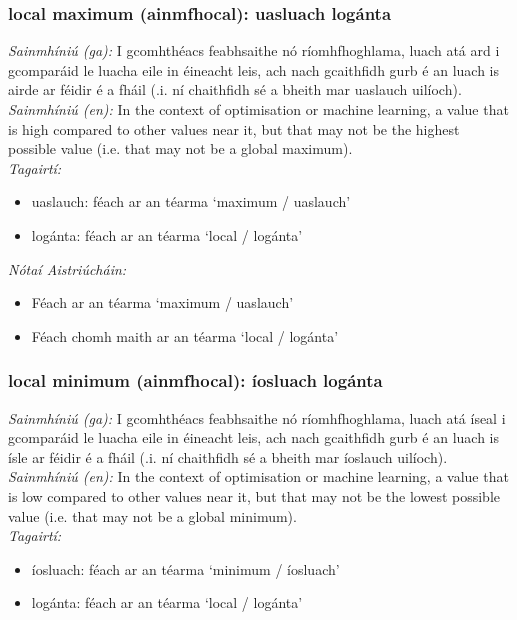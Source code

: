 \subsubsection*{local maximum (ainmfhocal): uasluach logánta}
 \noindent \textit{Sainmhíniú (ga):} I gcomhthéacs feabhsaithe nó ríomhfhoghlama, luach atá ard i gcomparáid le luacha eile in éineacht leis, ach nach gcaithfidh gurb é an luach is airde ar féidir é a fháil (.i. ní chaithfidh sé a bheith mar uaslauch uilíoch).
\\
 \noindent \textit{Sainmhíniú (en):} In the context of optimisation or machine learning, a value that is high compared to other values near it, but that may not be the highest possible value (i.e. that may not be a global maximum).
\\
 \noindent \textit{Tagairtí:}
\begin{itemize}
	\item uaslauch: féach ar an téarma `maximum / uaslauch'
	\item logánta: féach ar an téarma `local / logánta'
\end{itemize}

 \noindent \textit{Nótaí Aistriúcháin:}
\begin{itemize}
	\item Féach ar an téarma `maximum / uaslauch'
	\item Féach chomh maith ar an téarma `local / logánta'
\end{itemize}


\subsubsection*{local minimum (ainmfhocal): íosluach logánta}
 \noindent \textit{Sainmhíniú (ga):} I gcomhthéacs feabhsaithe nó ríomhfhoghlama, luach atá íseal i gcomparáid le luacha eile in éineacht leis, ach nach gcaithfidh gurb é an luach is ísle ar féidir é a fháil (.i. ní chaithfidh sé a bheith mar íoslauch uilíoch).
\\
 \noindent \textit{Sainmhíniú (en):} In the context of optimisation or machine learning, a value that is low compared to other values near it, but that may not be the lowest possible value (i.e. that may not be a global minimum).
\\
 \noindent \textit{Tagairtí:}
\begin{itemize}
	\item íosluach: féach ar an téarma `minimum / íosluach'
	\item logánta: féach ar an téarma `local / logánta'
\end{itemize}

